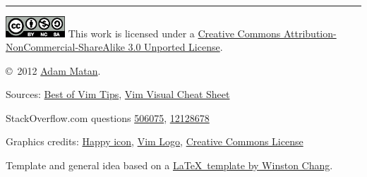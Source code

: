 \documentclass[10pt,landscape]{article}
\begin{document}
\begin{multicols}{3}
\begin{center}
\rule{0.3\linewidth}{0.25pt}
\end{center}


\includegraphics[width=6em]{../img/by_nc_sa.eps} This work is licensed under a \href{http://creativecommons.org/licenses/by-nc-sa/3.0/}{Creative Commons Attribution-NonCommercial-ShareAlike 3.0 Unported License}.

{\copyright\ 2012 \href{http://matan.name}{Adam Matan}.}

\begin{tiny}
Sources: 	\href{http://rayninfo.co.uk/vimtips.html}{Best of Vim Tips},
			\href{http://people.csail.mit.edu/vgod/vim/vim-cheat-sheet-en.pdf}{Vim Visual Cheat Sheet}
			
StackOverflow.com questions \href{http://stackoverflow.com/questions/506075/how-do-i-fix-the-indentation-of-an-entire-file-in-vi}	{506075},
							\href{http://stackoverflow.com/questions/12128678/vim-go-to-beginning-end-of-next-method}				{12128678}

Graphics credits: 	\href{http://commons.wikimedia.org/wiki/File:Gnome-face-smile.svg}	{Happy icon},
					\href{http://en.wikipedia.org/wiki/File:Vimlogo.svg}				{Vim Logo},
					\href{http://creativecommons.org/about/downloads}					{Creative Commons License}



Template and general idea based on a \href{http://www.stdout.org/~winston/latex/}{\LaTeX\ template by Winston Chang}.
\end{tiny}




\end{multicols}
\end{document}
